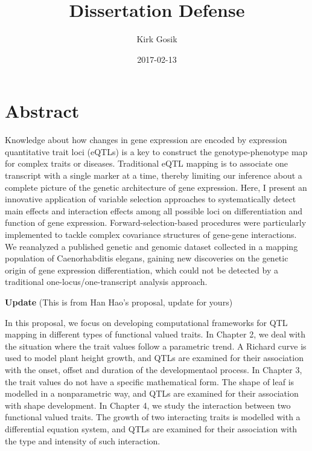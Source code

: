 \documentclass[11pt,]{book}
\title{Dissertation Defense}
\author{Kirk Gosik}
\date{2017-02-13}
\theoremstyle{definition}
\theoremstyle{definition}
\theoremstyle{remark}
\begin{document}
\maketitle

{
\setcounter{tocdepth}{1}
\tableofcontents
}
\listoftables
\listoffigures
\chapter*{Abstract}\label{abstract}

Knowledge about how changes in gene expression are encoded by expression
quantitative trait loci (eQTLs) is a key to construct the
genotype-phenotype map for complex traits or diseases. Traditional eQTL
mapping is to associate one transcript with a single marker at a time,
thereby limiting our inference about a complete picture of the genetic
architecture of gene expression. Here, I present an innovative
application of variable selection approaches to systematically detect
main effects and interaction effects among all possible loci on
differentiation and function of gene expression. Forward-selection-based
procedures were particularly implemented to tackle complex covariance
structures of gene-gene interactions. We reanalyzed a published genetic
and genomic dataset collected in a mapping population of Caenorhabditis
elegans, gaining new discoveries on the genetic origin of gene
expression differentiation, which could not be detected by a traditional
one-locus/one-transcript analysis approach.

\textbf{Update} (This is from Han Hao's proposal, update for yours)

In this proposal, we focus on developing computational frameworks for
QTL mapping in different types of functional valued traits. In Chapter
2, we deal with the situation where the trait values follow a parametric
trend. A Richard curve is used to model plant height growth, and QTLs
are examined for their association with the onset, offset and duration
of the developmentaol process. In Chapter 3, the trait values do not
have a specific mathematical form. The shape of leaf is modelled in a
nonparametric way, and QTLs are examined for their association with
shape development. In Chapter 4, we study the interaction between two
functional valued traits. The growth of two interacting traits is
modelled with a differential equation system, and QTLs are examined for
their association with the type and intensity of such interaction.
\end{document}
